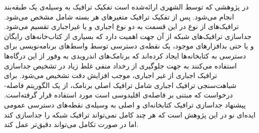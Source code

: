 در پژوهشی که توسط الشهری ارائه‌شده است تفکیک ترافیک به وسیله‌ی یک طبقه‌بند انجام می‌‌شود. پس از تفکیک ترافیک متغیر‌های هر بسته شامل  مشخص‌ می‌شود. ترافیک‌های از نوع  در این قسمت به دو نوع اجباری و یا غیراجباری تقسیم می‌شود. جداسازی ترافیک‌های شبکه از آن‌ جهت اهمیت دارد که بسیاری از کتاب‌خانه‌های رایگان و یا حتی بدافزار‌های موجود، یک نقطه‌ی دسترسی توسط واسط‌های برنامه‌نویسی برای دسترسی به کتابخانه‌ها ایجاد کرده‌اند که برنامک‌های اندرویدی به وفور از این درگاه‌ها استفاده می‌کنند به جهت جلوگیری از رخداد منفی غلط زیاد در تشخیص جداسازی ترافیک اجباری از غیر اجباری، موجب افزایش دقت تشخیص می‌شود. برای شباهت‌سنجی ترافیک اجباری شامل ترافیک اصلی برنامک، از یک الگوریتم فاصله‌-درخواست که مبتنی بر فاصله‌ی اقلیدوسی است مورد استفاده قرار گرفته‌است. پیشنهاد جداسازی ترافیک کتابخانه‌ای و اصلی به وسیله‌ی نقطه‌های دسترسی عمومی ایده‌ای نو در این پژوهش است که هر چند کامل نمی‌تواند ترافیک‌ شبکه را جداسازی کند اما در صورت تکامل می‌تواند دقیق‌تر عمل کند. 

